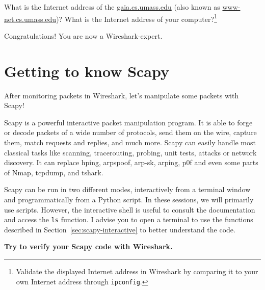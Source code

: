 \documentclass[11pt,a4paper]{article}
\begin{document}
\begin{question}
    What is the Internet address of the \url{gaia.cs.umass.edu} (also known as \url{www-net.cs.umass.edu})? What is the Internet address of your computer?\footnote{Validate the displayed Internet address in Wireshark by comparing it to your own Internet address through \texttt{ipconfig}.}
\end{question}

Congratulations! You are now a Wireshark-expert.

\FloatBarrier
\section{Getting to know Scapy}\label{sec:getting-to-know-scapy}
After monitoring packets in Wireshark, let's manipulate some packets with Scapy!

Scapy is a powerful interactive packet manipulation program. It is able to forge or decode packets of a wide number of protocols, send them on the wire, capture them, match requests and replies, and much more. Scapy can easily handle most classical tasks like scanning, tracerouting, probing, unit tests, attacks or network discovery. It can replace hping, arpspoof, arp-sk, arping, p0f and even some parts of Nmap, tcpdump, and tshark.

Scapy can be run in two different modes, interactively from a terminal window and programmatically from a Python script. 
In these sessions, we will primarily use scripts. However, the interactive shell is useful to consult the documentation and  access the \texttt{ls} function. I advise you to open a terminal to use the functions described in Section~\ref{sec:scapy-interactive} to better understand the code. 

\textbf{Try to verify your Scapy code with Wireshark.}
\end{document}
